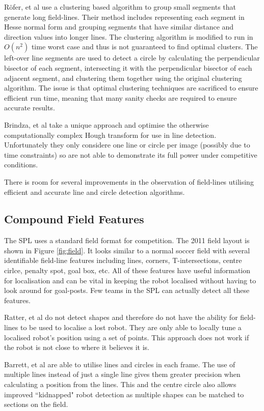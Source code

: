 \documentclass[runningheads,a4paper]{llncs}
\begin{document}
R{\"o}fer, et al \cite{BHumanCodeRelease2010} use a clustering based algorithm to group small segments that generate long field-lines. Their method includes representing each segment in Hesse normal form and grouping segments that have similar distance and direction values into longer lines. The clustering algorithm is modified to run in $O(n^2)$ time worst case and thus is not guaranteed to find optimal clusters. The left-over line segments are used to detect a circle by calculating the perpendicular bisector of each segment, intersecting it with the perpendicular bisector of each adjacent segment, and clustering them together using the original clustering algorithm. The issue is that optimal clustering techniques are sacrificed to ensure efficient run time, meaning that many sanity checks are required to ensure accurate results.

Brindza, et al \cite{UPenn2010} take a unique approach and optimise the otherwise computationally complex Hough transform \cite{HoughTransform} for use in line detection. Unfortunately they only considere one line or circle per image (possibly due to time constraints) so are not able to demonstrate its full power under competitive conditions.

There is room for several improvements in the observation of field-lines utilising efficient and accurate line and circle detection algorithms.

\subsection{Compound Field Features}
The SPL uses a standard field format for competition. The 2011 field layout is shown in Figure \ref{fig:field}. It looks similar to a normal soccer field with several identifiable field-line features including lines, corners, T-intersections, centre cirlce, penalty spot, goal box, etc. All of these features have useful information for localisation and can be vital in keeping the robot localised without having to look around for goal-posts. Few teams in the SPL can actually detect all these features.

Ratter, et al \cite{rUNSWift2010} do not detect shapes and therefore do not have the ability for field-lines to be used to localise a lost robot. They are only able to locally tune a localised robot's position using a set of points. This approach does not work if the robot is not close to where it believes it is. 

Barrett, et al \cite{uTAustin2010} are able to utilise lines and circles in each frame. The use of multiple lines instead of just a single line gives them greater precision when calculating a position from the lines. This and the centre circle also allows improved ``kidnapped" robot detection as multiple shapes can be matched to sections on the field.
\end{document}

